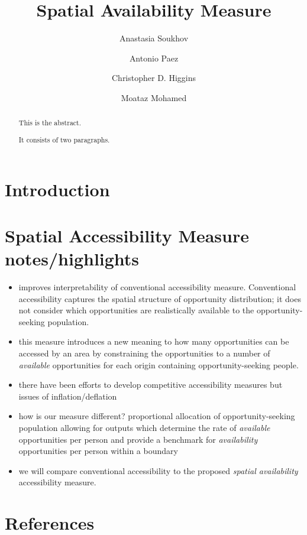 \documentclass[]{elsarticle} %
\providecommand{\tightlist}{%
  \setlength{\itemsep}{0pt}\setlength{\parskip}{0pt}}
\begin{document}
\begin{frontmatter}

  \title{Spatial Availability Measure}
    \author[McMaster University]{Anastasia Soukhov}
    \author[McMaster University]{Antonio Paez}
    \author[University of Toronto Scarborough]{Christopher D. Higgins}
    \author[McMaster University]{Moataz Mohamed}
      \address[McMaster University]{School of Earth, Environment and
Society, McMaster University, Hamilton, ON, L8S 4K1, Canada}
    \address[University of Toronto Scarborough]{Department of Geography
\& Planning, University of Toronto Scarborough, 1265 Military Trail,
Toronto, ON M1C1A4}
  
  \begin{abstract}
  This is the abstract.

  It consists of two paragraphs.
  \end{abstract}
  
 \end{frontmatter}

\hypertarget{introduction}{%
\section{Introduction}\label{introduction}}

\hypertarget{spatial-accessibility-measure-noteshighlights}{%
\section{Spatial Accessibility Measure
notes/highlights}\label{spatial-accessibility-measure-noteshighlights}}

\begin{itemize}
\tightlist
\item
  improves interpretability of conventional accessibility measure.
  Conventional accessibility captures the spatial structure of
  opportunity distribution; it does not consider which opportunities are
  realistically available to the opportunity-seeking population.
\item
  this measure introduces a new meaning to how many opportunities can be
  accessed by an area by constraining the opportunities to a number of
  \emph{available} opportunities for each origin containing
  opportunity-seeking people.
\item
  there have been efforts to develop competitive accessibility measures
  but issues of inflation/deflation
\item
  how is our measure different? proportional allocation of
  opportunity-seeking population allowing for outputs which determine
  the rate of \emph{available} opportunities per person and provide a
  benchmark for \emph{availability} opportunities per person within a
  boundary
\item
  we will compare conventional accessibility to the proposed
  \emph{spatial availability} accessibility measure.
\end{itemize}

\hypertarget{references}{%
\section*{References}\label{references}}
\end{document}

